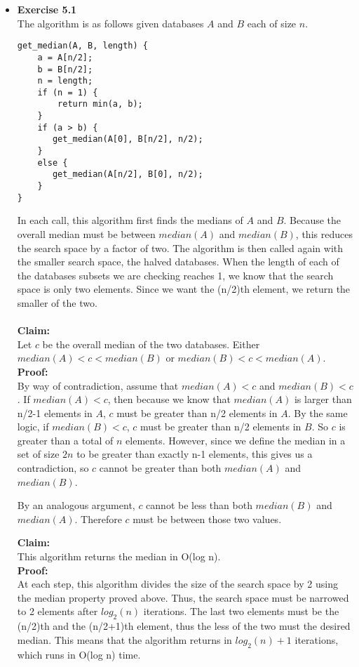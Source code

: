 \documentclass[a4paper]{article}
\begin{document}
\begin{itemize}
\item{\textbf{Exercise 5.1}} \\
The algorithm is as follows given databases $A$ and $B$ each of size $n$.
\begin{verbatim}
get_median(A, B, length) {
    a = A[n/2];
    b = B[n/2];
    n = length;
    if (n = 1) {
    	return min(a, b);
    }
    if (a > b) {
       get_median(A[0], B[n/2], n/2);
    }
    else {
       get_median(A[n/2], B[0], n/2);
    }
}
\end{verbatim}
In each call, this algorithm first finds the medians of $A$ and $B$. Because the overall median must be between $median(A)$ and $median(B)$, this reduces the search space by a factor of two. The algorithm is then called again with the smaller search space, the halved databases. When the length of each of the databases subsets we are checking reaches 1, we know that the search space is only two elements. Since we want the (n/2)th element, we return the smaller of the two. \\
\\
\textbf{Claim:} \\
Let $c$ be the overall median of the two databases. Either $median(A) < c < median(B)$ or $median(B) < c < median(A)$. \\
\textbf{Proof:} \\
By way of contradiction, assume that $median(A) < c$ and $median(B) < c$. If $median(A) < c$, then because we know that $median(A)$ is larger than n/2-1 elements in $A$, $c$ must be greater than n/2 elements in $A$. By the same logic, if $median(B) < c$, $c$ must be greater than n/2 elements in $B$. So $c$ is greater than a total of $n$ elements. However, since we define the median in a set of size $2n$ to be greater than exactly n-1 elements, this gives us a contradiction, so $c$ cannot be greater than both $median(A)$ and $median(B)$.

By an analogous argument, $c$ cannot be less than both $median(B)$ and $median(A)$. Therefore $c$ must be between those two values.

\textbf{Claim:} \\
This algorithm returns the median in O(log n). \\
\textbf{Proof:} \\
At each step, this algorithm divides the size of the search space by 2 using the median property proved above. Thus, the search space must be narrowed to 2 elements after $log_2(n)$ iterations. The last two elements must be the (n/2)th and the (n/2+1)th element, thus the less of the two must the desired median. This means that the algorithm returns in $log_2(n)+1$ iterations, which runs in O(log n) time. \\ \\


\end{itemize}
\end{document}
